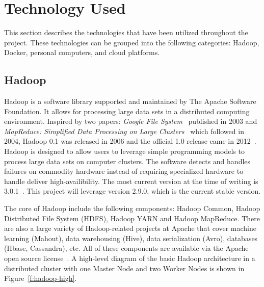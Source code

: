 \section{Technology Used}\label{s:techused}

This section describes the technologies that have been utilized
throughout the project. These technologies can be grouped into the
following categories: Hadoop, Docker, personal computers, and cloud
platforms.

\subsection{Hadoop}
Hadoop is a software library supported and maintained by The Apache
Software Foundation. It allows for processing large data sets in a
distributed computing environment. Inspired by two
papers: \textit{Google File
System}~\cite{hid-sp18-405-ghem2003goolefilesystem} published in 2003
and \textit{MapReduce: Simplified Data Processing on Large
Clusters}~\cite{hid-sp18-405-dean2008mapreduce} which followed in
2004, Hadoop 0.1 was released in 2006 and the official 1.0 release
came in 2012~\cite{hid-sp18-405-hadoop-wiki}. Hadoop is designed to
allow users to leverage simple programming models to process large
data sets on computer clusters. The software detects and handles
failures on commodity hardware instead of requiring specialized
hardware to handle deliver high-availibility. The most current version
at the time of writing is
3.0.1~\cite{hid-sp18-405-hadoop-official}. This project will leverage
version 2.9.0, which is the current stable version.

The core of Hadoop include the following components: Hadoop Common,
Hadoop Distributed File System (HDFS), Hadoop YARN and Hadoop
MapReduce. There are also a large variety of Hadoop-related projects
at Apache that cover machine learning (Mahout), data warehousing
(Hive), data serialization (Avro), databases (Hbase, Cassandra),
etc. All of these components are available via the Apache open source
license~\cite{hid-sp18-405-hadoop-official}. A high-level diagram of
the basic Hadoop architecture in a distributed cluster with one Master
Node and two Worker Nodes is shown in Figure~\ref{f:hadoop-high}.

